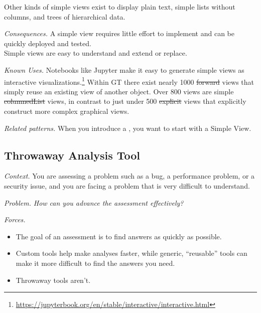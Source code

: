 \documentclass[acmsmall,screen,authorversion,nonacm]{acmart} %
\newcommand\cp[1]{\nbe{Cesare}{#1}{olive}} %
\newcommand\ws[1]{\nbe{Workshop}{#1}{teal}} %
\newcommand{\pattern}[2]{\needlines{10}
\subsection*{#1}\label{pat:#2}}
\newcommand{\patref}[1]{\emph{\nameref{pat:#1}}\xspace}
\newcommand{\patsec}[1]{\noindent\textit{#1.}\xspace}
\begin{document}
Other kinds of simple views exist to display plain text, simple lists without columns, and trees of hierarchical data.

\patsec{Consequences}
A simple view requires little effort to implement and can be quickly deployed and tested.\\
Simple views are easy to understand and extend or replace.

\patsec{Known Uses}
Notebooks like Jupyter make it easy to generate simple views as interactive visualizations.\footnote{\href{https://web.archive.org/web/20240430071604/https://jupyterbook.org/en/stable/interactive/interactive.html}{https://jupyterbook.org/en/stable/interactive/interactive.html}}
Within GT there exist nearly 1000 \st{forward} views that simply reuse an existing view of another object.
Over 800 views are simple \st{columnedList} views, in contrast to just under 500 \st{explicit} views that explicitly construct more complex graphical views.

\patsec{Related patterns}
When you introduce a \patref{CustomView}, you want to start with a Simple View.

\pattern{Throwaway Analysis Tool}{ThrowawayAnalysisTool}


\patsec{Context}
You are assessing a problem such as a bug, a performance problem, or a security issue, and you are facing a problem that is very difficult to understand.

\patsec{Problem}
\emph{How can you advance the assessment effectively?}

\patsec{Forces}
\begin{itemize}[---]
\item The goal of an assessment is to find answers as quickly as possible.
\item Custom tools help make analyses faster, while generic, ``reusable'' tools can make it more difficult to find the answers you need.
\item Throwaway tools aren't.
\end{itemize}
\end{document}
